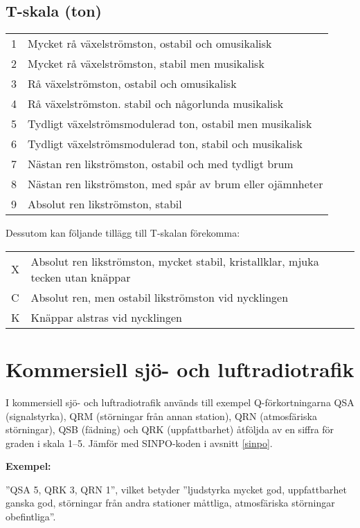 \subsection{T-skala (ton)}

\begin{tabular}{p{}p{}}
1 & Mycket rå växelströmston, ostabil och omusikalisk \\
2 & Mycket rå växelströmston, stabil men musikalisk \\
3 & Rå växelströmston, ostabil och omusikalisk \\
4 & Rå växelströmston. stabil och någorlunda musikalisk \\
5 & Tydligt växelströmsmodulerad ton, ostabil men musikalisk \\
6 & Tydligt växelströmsmodulerad ton, stabil och musikalisk \\
7 & Nästan ren likströmston, ostabil och med tydligt brum \\
8 & Nästan ren likströmston, med spår av brum eller ojämnheter \\
9 & Absolut ren likströmston, stabil \\
\end{tabular}

Dessutom kan följande tillägg till T-skalan förekomma:

\begin{tabular}{p{}p{}}
  X & Absolut ren likströmston, mycket stabil, kristallklar, mjuka tecken utan
      knäppar \\
C & Absolut ren, men ostabil likströmston vid nycklingen \\
K & Knäppar alstras vid nycklingen \\
\end{tabular}

\section{Kommersiell sjö- och luftradiotrafik}

I kommersiell sjö- och luftradiotrafik används till exempel Q-förkortningarna
QSA (signalstyrka), QRM (störningar från annan station), QRN
(atmosfäriska störningar), QSB (fädning) och QRK (uppfattbarhet)
åtföljda av en siffra för graden i skala 1--5. Jämför med SINPO-koden
i avsnitt \ref{sinpo}.

\textbf{Exempel:}

''QSA 5, QRK 3, QRN 1'', vilket betyder
''ljudstyrka mycket god, uppfattbarhet ganska god, störningar från andra
stationer måttliga, atmosfäriska störningar obefintliga''.

